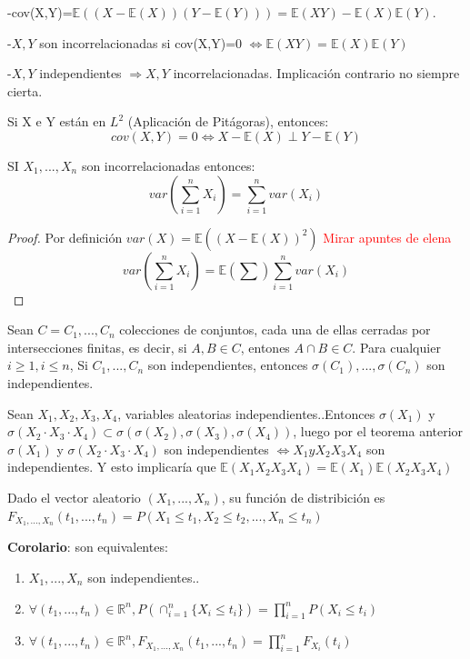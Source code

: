 \documentclass{apuntes}
\begin{document}
\begin{defn}

-cov(X,Y)=$\mathbb{E}((X-\mathbb{E}(X))(Y-\mathbb{E}(Y)))=\mathbb{E}(XY)-\mathbb{E}(X)\mathbb{E}(Y)$.

-$X,Y$ son incorrelacionadas si cov(X,Y)=0 $\Leftrightarrow \mathbb{E}(XY)=\mathbb{E}(X)\mathbb{E}(Y) $

-$X,Y$ independientes $\Rightarrow X,Y$ incorrelacionadas. Implicación contrario no siempre cierta.
\end{defn}

\obs Si X e Y están en $L^2$ (Aplicación de Pitágoras), entonces:
\[
cov(X,Y)=0 \Leftrightarrow X-\mathbb{E}(X) \perp Y - \mathbb{E}(Y)
\]

\obs SI $X_1,...,X_n$ son incorrelacionadas entonces:
\[
var(\sum_{i=1}^{n} X_i) = \sum_{i=1}^{n}var(X_i)
\]
\begin{proof}
Por definición $var(X)=\mathbb{E}((X-\mathbb{E}(X))^2)$
\textcolor{red}{Mirar apuntes de elena}
\[
var(\sum_{i=1}^{n} X_i) = \mathbb{E}(\sum)   \sum_{i=1}^{n}var(X_i)
\]
\end{proof}

\begin{theorem}
Sean $C=C_1,...,C_n$ colecciones de conjuntos, cada una de ellas cerradas por intersecciones finitas, es decir, si $A,B \in C$, entones $A \cap B \in C$. Para cualquier $i\geq1 , i \leq n$, Si $C_1,...,C_n$ son independientes, entonces $\sigma(C_1),...,\sigma(C_n)$ son independientes.
\end{theorem}

\begin{example}
Sean $X_1, X_2, X_3, X_4$, variables aleatorias independientes..Entonces $\sigma(X_1)$ y $\sigma(X_2 \cdot X_3 \cdot X_4) \subset \sigma(\sigma(X_2),\sigma(X_3),\sigma(X_4))$, luego por el teorema anterior  $\sigma(X_1)$ y $\sigma(X_2 \cdot X_3 \cdot X_4)$ son independientes $\Leftrightarrow X_1 y X_2X_3X_4$ son independientes. Y esto implicaría que $\mathbb{E}(X_1X_2X_3X_4)=\mathbb{E}(X_1)\mathbb{E}(X_2X_3X_4)$
\end{example}

\begin{defn}
Dado el vector aleatorio $(X_1,...,X_n)$, su función de distribición es $F_{X_1,...,X_n}(t_1,...,t_n)=P(X_1 \leq t_1, X_2 \leq t_2,...,X_n \leq t_n)$
\end{defn}

\textbf{Corolario}: son equivalentes:
\begin{enumerate}
\item $X_1,...,X_n$ son independientes..
\item $\forall(t_1,...,t_n) \in \mathbb{R}^n, P(\cap_{i=1}^n \{X_i \leq t_i\})=\prod_{i=1}^{n}P(X_i \leq t_i)$
\item $\forall(t_1,...,t_n) \in \mathbb{R}^n, F_{X_1,...,X_n}(t_1,...,t_n)=\prod_{i=1}^{n}F_{X_i}(t_i)$
\end{enumerate}
\end{document}
